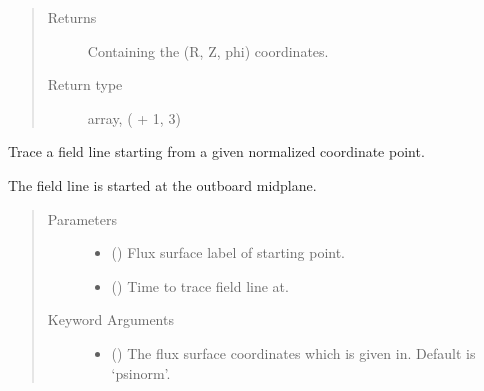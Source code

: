 \documentclass[letterpaper,10pt,english]{sphinxmanual}
\begin{document}
\begin{fulllineitems}
\begin{fulllineitems}
\begin{quote}
\begin{description}
\begin{itemize}
\end{itemize}

\item[{Returns}] \leavevmode
Containing the (R, Z, phi) coordinates.

\item[{Return type}] \leavevmode
array, ( + 1, 3)

\end{description}\end{quote}

\end{fulllineitems}


\begin{fulllineitems}
\label{\detokenize{eqtools:eqtools.core.Equilibrium.rho2FieldLineTrace}}
Trace a field line starting from a given normalized coordinate point.

The field line is started at the outboard midplane.
\begin{quote}\begin{description}
\item[{Parameters}] \leavevmode\begin{itemize}
\item {} 
 () \textendash{} Flux surface label of starting point.

\item {} 
 () \textendash{} Time to trace field line at.

\end{itemize}

\item[{Keyword Arguments}] \leavevmode\begin{itemize}
\item {} 
 (\sphinxstyleliteralemphasis{\sphinxupquote{, }}\sphinxstyleliteralemphasis{\sphinxupquote{, }}\sphinxstyleliteralemphasis{\sphinxupquote{, }}\sphinxstyleliteralemphasis{\sphinxupquote{, }}\sphinxstyleliteralemphasis{\sphinxupquote{, }}) \textendash{} The flux surface coordinates which  is given in.
Default is ‘psinorm’.


\end{itemize}
\end{description}
\end{quote}
\end{fulllineitems}
\end{fulllineitems}
\end{document}
